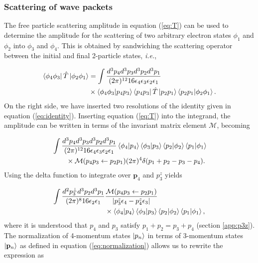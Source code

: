 \documentclass[twoside,twocolumn,9pt]{article}
\begin{document}
\subsubsection{Scattering of wave packets} 
\label{sec:wavepackets}

The free particle scattering amplitude in equation (\ref{eq:T}) can be used to
determine the amplitude for the scattering of two arbitrary electron states
$\phi_1$ and $\phi_2$ into $\phi_3$ and $\phi_4$.
This is obtained by sandwiching the scattering operator between the initial and
final 2-particle states, \textit{i.e.},

\begin{equation} 
  \label{eq:amp} 
  \begin{aligned}
    \bra{\phi_4\phi_3} \hat{T} \ket{\phi_2\phi_1}
    &= 
    \int \frac{d^3p_4d^3p_3d^3p_2d^3p_1} {(2\pi)^{12}
    16\epsilon_4\epsilon_3\epsilon_2\epsilon_1}
    \\&\times
    \bra{\phi_4\phi_3}\ket{p_4p_3} \bra{p_4p_3}\hat{T}\ket{p_2p_1}
    \bra{p_2p_1}\ket{\phi_2\phi_1}.
\end{aligned} 
\end{equation}
%
On the right side, we have inserted two resolutions of the identity given in
equation (\ref{eq:identity}). Inserting equation (\ref{eq:T}) into the
integrand, the amplitude can be written in terms of the invariant matrix
element $\mathcal{M}$, becoming

\begin{equation} 
  \label{eq:ampPlugInM} 
  \begin{aligned}
    &\int\frac{d^3p_4d^3p_3d^3p_2d^3p_1} {(2\pi)^{12}
    16\epsilon_4\epsilon_3\epsilon_2\epsilon_1} \bra{\phi_4}\ket{p_4}
    \bra{\phi_3}\ket{p_3} \bra{p_2}\ket{\phi_2} \bra{p_1}\ket{\phi_1}
    \\&\qquad\times 
    \mathcal{M}(p_4p_3\leftarrow p_2p_1) 
    (2\pi)^4\delta(p_1 + p_2 - p_3 - p_4).  
\end{aligned} 
\end{equation}
%
Using the delta function to integrate over $\mathbf{p}_4$ and $p_3^z$ yields

\begin{equation} 
  \label{eq:ampUseDelta} 
  \begin{aligned} 
    \int\frac{d^2p_3^\perp d^3p_2d^3p_1}
    {(2\pi)^{8} 16\epsilon_2\epsilon_1}
    &\frac{\mathcal{M}(p_4p_3\leftarrow p_2p_1)}
    {\left|p_3^z\epsilon_4 - p_4^z\epsilon_3\right|}
    \\&\times
    \bra{\phi_4}\ket{p_4}
    \bra{\phi_3}\ket{p_3}
    \bra{p_2}\ket{\phi_2}
    \bra{p_1}\ket{\phi_1},
  \end{aligned} 
\end{equation}
%
where it is understood that $p_4$ and $p_3$ satisfy $p_1 + p_2 = p_3 + p_4$
(section \ref{app:p3z}).
The normalization of 4-momentum states $\ket{p_n}$ in terms of
3-momentum states $\ket{\mathbf{p}_n}$ as defined in equation
(\ref{eq:normalization}) allows us to rewrite the expression as
\end{document}

